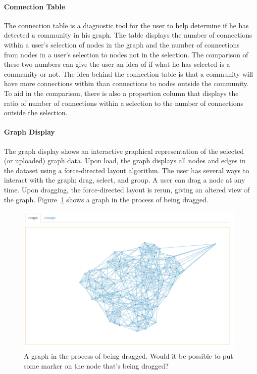 \documentclass{article}\usepackage[]{graphicx}\usepackage[]{color}
\newcommand{\hh}[1]{{\color{magenta} #1}}
\begin{document}
\paragraph{Connection Table}
The connection table is a diagnostic tool for the user to help determine if he has detected a community in his graph. The  table displays the number of connections within a user's selection of nodes in the graph and the number of connections from nodes in a user's selection to nodes not in the selection. The comparison of these two numbers can give the user an idea of if what he has selected is a community or not. The idea behind the connection table is that a community will have more connections within than connections to nodes outside the community.  To aid in the comparison, there is also a proportion column that displays the ratio of number of connections within a selection to the number of connections outside the selection. 

\paragraph{Graph Display}
The graph display shows an interactive graphical representation of  the selected (or uploaded) graph data. Upon load, the graph displays all nodes and edges in the dataset using a force-directed layout algorithm. The user has several ways to interact with the graph: drag, select, and group. A user can drag a node at any time. %
Upon dragging, the force-directed layout is  rerun, giving an altered view of the graph. Figure~\ref{fig:graphdrag} shows a graph in the process of being dragged.

\begin{figure}[H]
\centering
\includegraphics[width=\textwidth]{images/graphdrag.png}
\caption{\label{fig:graphdrag} A graph in the process of being dragged. \hh{Would it be possible to put some marker on the node that's being dragged?}}
\end{figure}
\end{document}
